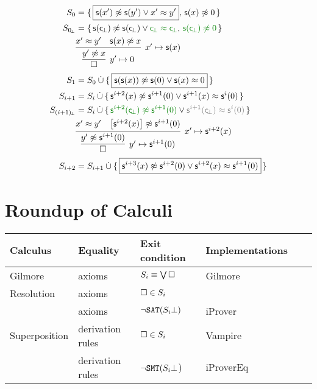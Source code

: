 \begin{align*}
S_0 &= \{ \, \boxed{\msucc(x') \mNE \msucc (y') \lor x' \mEQ y'}, \, \msucc(x)\mNE 0 \, \}
\\
S_{0\!_\bot} &= \{ \, \msucc(\consbot) \mNE \msucc (\consbot) \lor{\colHi\consbot \mEQ \consbot}, \, {\colHi \msucc(\consbot)\mNE 0} \, \}
\\
&\infer[x'\mapsto \msucc(x)
]{
	\infer[y'\mapsto 0]{\emptyclause}{ y'\mNE x }
}
{x' \mEQ y' & \msucc(x)\mNE x}
\\
S_1 &= S_0\disjointunion \{ \,
\boxed{\msucc(\msucc(x)) \mNE \msucc(0) \lor \msucc(x) \mEQ 0} \,
\}
\\
S_{i+1} &= S_i\disjointunion \{ \,
\msucc^{i+2}(x) \mNE \msucc^{i+1} (0) \lor \msucc^{i+1}(x) \mEQ \msucc^i(0) \,
\}
\\
S_{(i+1)\!_\bot} &= S_i\disjointunion \{ \,
{\colHi \msucc^{i+2}(\consbot) \mNE \msucc^{i+1} (0)} \lor {\colG\msucc^{i+1}(\consbot) \mEQ \msucc^i(0)} \,
\}
\\
&\infer[x'\mapsto \msucc^{i+2}(x)
]{
	\infer[y'\mapsto \msucc^{i+1}(0)]{\emptyclause}{ y'\mNE \msucc^{i+1}(0) }
}
{x' \mEQ y' & \left[\msucc^{i+2}(x)\right]\mNE \msucc^{i+1}(0)}
\\
S_{i+2} &= S_{i+1}\disjointunion \{ \,
\boxed{\msucc^{i+3}(x) \mNE \msucc^{i+2}(0) \lor \msucc^{i+2}(x) \mEQ \msucc^{i+1}(0)} \,
\}
\end{align*}

\section{Roundup of Calculi}

\begin{tabular}{llllll}
	\toprule
	Calculus & Equality & Exit condition & Implementations
	\\ \midrule
	Gilmore & axioms & \( S_i \equiv \bigvee\square \) & Gilmore
	\\
	Resolution & axioms & \( \square\in S_i \)
	\\
	\InstGen{} & axioms & \( \lnot\texttt{SAT}(S_i\bot) \) & iProver\\
	Superposition & derivation rules & \( \square\in S_i \) & Vampire
	\\
	\InstGenEQ{} & derivation rules & \( \lnot\texttt{SMT}(S_i\bot \)) & iProverEq
	\\ \bottomrule
\end{tabular}





